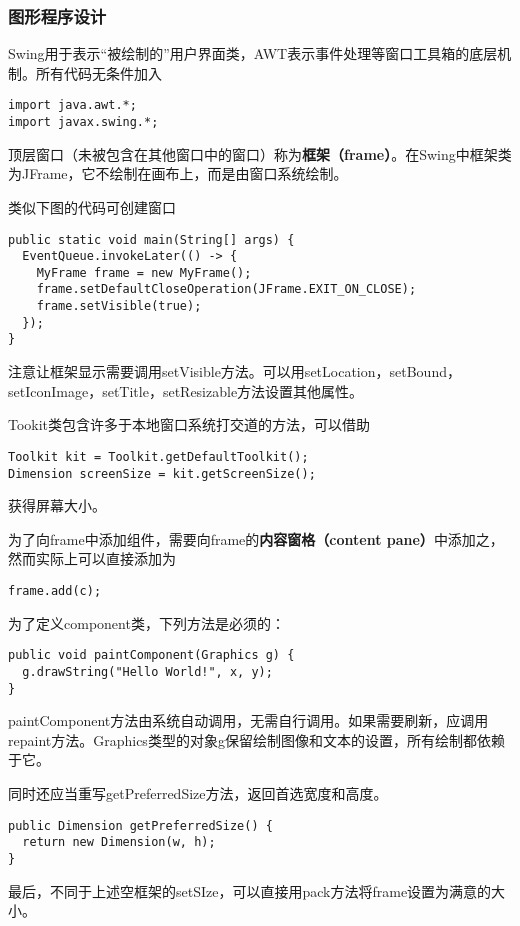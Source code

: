 \documentclass{ctexart}
\newcommand{\term}[2]{\textbf{#1（#2）}}
\begin{document}
\subsubsection*{图形程序设计}
Swing用于表示“被绘制的”用户界面类，AWT表示事件处理等窗口工具箱的底层机制。所有代码无条件加入
\begin{lstlisting}
import java.awt.*;
import javax.swing.*;
\end{lstlisting}
\par
顶层窗口（未被包含在其他窗口中的窗口）称为\term{框架}{frame}。在Swing中框架类为JFrame，它不绘制在画布上，而是由窗口系统绘制。
\par
类似下图的代码可创建窗口
\begin{lstlisting}
public static void main(String[] args) {
  EventQueue.invokeLater(() -> {
    MyFrame frame = new MyFrame();
    frame.setDefaultCloseOperation(JFrame.EXIT_ON_CLOSE);
    frame.setVisible(true);
  });
}
\end{lstlisting}
\par
注意让框架显示需要调用setVisible方法。可以用setLocation，setBound，setIconImage，setTitle，setResizable方法设置其他属性。
\par
Tookit类包含许多于本地窗口系统打交道的方法，可以借助
\begin{lstlisting}
Toolkit kit = Toolkit.getDefaultToolkit();
Dimension screenSize = kit.getScreenSize();
\end{lstlisting}
获得屏幕大小。
\par
为了向frame中添加组件，需要向frame的\term{内容窗格}{content pane}中添加之，然而实际上可以直接添加为
\begin{lstlisting}
frame.add(c);
\end{lstlisting}
\par
为了定义component类，下列方法是必须的：
\begin{lstlisting}
public void paintComponent(Graphics g) {
  g.drawString("Hello World!", x, y);
}
\end{lstlisting}
paintComponent方法由系统自动调用，无需自行调用。如果需要刷新，应调用repaint方法。Graphics类型的对象g保留绘制图像和文本的设置，所有绘制都依赖于它。
\par
同时还应当重写getPreferredSize方法，返回首选宽度和高度。
\begin{lstlisting}
public Dimension getPreferredSize() {
  return new Dimension(w, h);
}
\end{lstlisting}
\par
最后，不同于上述空框架的setSIze，可以直接用pack方法将frame设置为满意的大小。
\par
\end{document}
